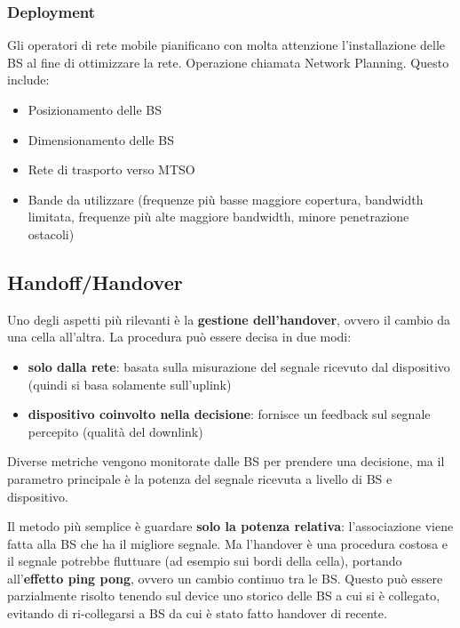 \subsubsection{Deployment}

Gli operatori di rete mobile pianificano con molta attenzione l'installazione delle BS al fine di ottimizzare la rete. Operazione chiamata Network Planning. Questo include:
\begin{itemize}
	\item Posizionamento delle BS

	\item Dimensionamento delle BS

	\item Rete di trasporto verso MTSO

	\item Bande da utilizzare (frequenze più basse maggiore copertura, bandwidth limitata, frequenze più alte maggiore bandwidth, minore penetrazione ostacoli)
\end{itemize}

\subsection{Handoff/Handover}

Uno degli aspetti più rilevanti è la \textbf{gestione dell'handover}, ovvero il cambio da una cella all'altra. La procedura può essere decisa in due modi:
\begin{itemize}
	\item \textbf{solo dalla rete}: basata sulla misurazione del segnale ricevuto dal dispositivo (quindi si basa solamente sull'uplink)

	\item \textbf{dispositivo coinvolto nella decisione}: fornisce un feedback sul segnale percepito (qualità del downlink)
\end{itemize}

Diverse metriche vengono monitorate dalle BS per prendere una decisione, ma il parametro principale è la potenza del segnale ricevuta a livello di BS e dispositivo.

Il metodo più semplice è guardare \textbf{solo la potenza relativa}: l'associazione viene fatta alla BS che ha il migliore segnale. Ma l'handover è una procedura costosa e il segnale potrebbe fluttuare (ad esempio sui bordi della cella), portando all'\textbf{effetto ping pong}, ovvero un cambio continuo tra le BS. Questo può essere parzialmente risolto tenendo sul device uno storico delle BS a cui si è collegato, evitando di ri-collegarsi a BS da cui è stato fatto handover di recente.

